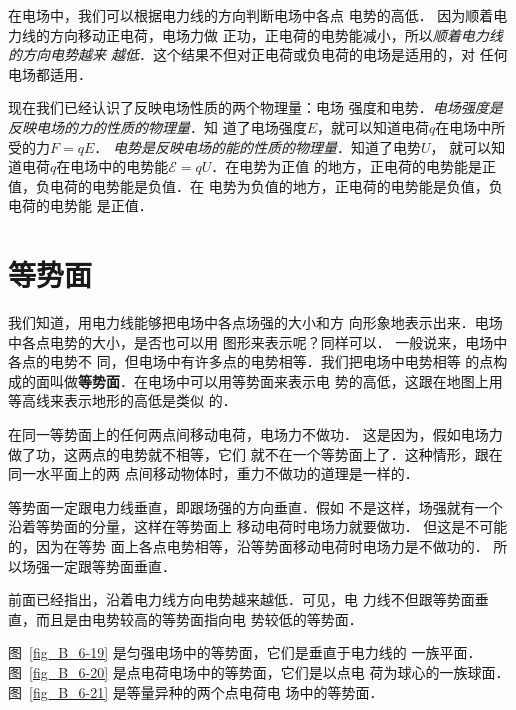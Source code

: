 在电场中，我们可以根据电力线的方向判断电场中各点
电势的高低．
因为顺着电力线的方向移动正电荷，电场力做
正功，正电荷的电势能减小，所以\textit{顺着电力线的方向电势越来
越低}．这个结果不但对正电荷或负电荷的电场是适用的，对
任何电场都适用．

现在我们已经认识了反映电场性质的两个物理量：电场
强度和电势．\textit{电场强度是反映电场的力的性质的物理量}．知
道了电场强度$E$，就可以知道电荷$q$在电场中所受的力$F=qE$．
\textit{电势是反映电场的能的性质的物理量}．知道了电势$U$，
就可以知道电荷$q$在电场中的电势能$\mathcal{E}=qU$．在电势为正值
的地方，正电荷的电势能是正值，负电荷的电势能是负值．在
电势为负值的地方，正电荷的电势能是负值，负电荷的电势能
是正值．

\section{等势面}

我们知道，用电力线能够把电场中各点场强的大小和方
向形象地表示出来．电场中各点电势的大小，是否也可以用
图形来表示呢？同样可以．
一般说来，电场中各点的电势不
同，但电场中有许多点的电势相等．我们把电场中电势相等
的点构成的面叫做\textbf{等势面}．在电场中可以用等势面来表示电
势的高低，这跟在地图上用等高线来表示地形的高低是类似
的．

在同一等势面上的任何两点间移动电荷，电场力不做功．
这是因为，假如电场力做了功，这两点的电势就不相等，它们
就不在一个等势面上了．这种情形，跟在同一水平面上的两
点间移动物体时，重力不做功的道理是一样的．

等势面一定跟电力线垂直，即跟场强的方向垂直．假如
不是这样，场强就有一个沿着等势面的分量，这样在等势面上
移动电荷时电场力就要做功．
但这是不可能的，因为在等势
面上各点电势相等，沿等势面移动电荷时电场力是不做功的．
所以场强一定跟等势面垂直．

前面已经指出，沿着电力线方向电势越来越低．可见，电
力线不但跟等势面垂直，而且是由电势较高的等势面指向电
势较低的等势面．




图~\ref{fig_B_6-19} 是匀强电场中的等势面，它们是垂直于电力线的
一族平面．图~\ref{fig_B_6-20} 是点电荷电场中的等势面，它们是以点电
荷为球心的一族球面．图~\ref{fig_B_6-21} 是等量异种的两个点电荷电
场中的等势面．

